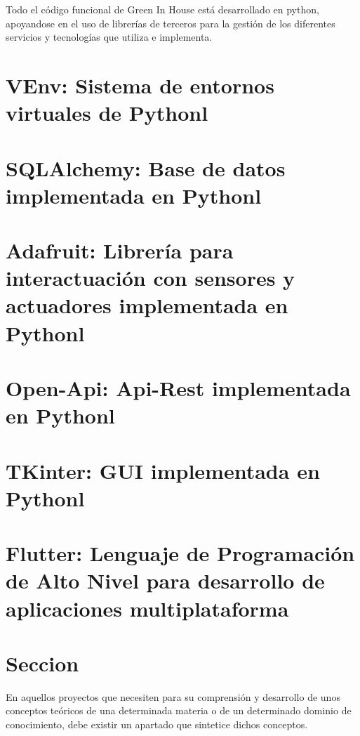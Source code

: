 Todo el código funcional de Green In House está desarrollado en python, apoyandose en el uso de librerías de terceros para la gestión de los diferentes servicios y tecnologías que utiliza e implementa.

\section{VEnv: Sistema de entornos virtuales de Pythonl}



\section{SQLAlchemy: Base de datos implementada en Pythonl}



\section{Adafruit: Librería para interactuación con sensores y actuadores implementada en Pythonl}



\section{Open-Api: Api-Rest implementada en Pythonl}



\section{TKinter: GUI implementada en Pythonl}



\section{Flutter: Lenguaje de Programación de Alto Nivel para desarrollo de aplicaciones multiplataforma}




\section{Seccion}

En aquellos proyectos que necesiten para su comprensión y desarrollo de unos conceptos teóricos de una determinada materia o de un determinado dominio de conocimiento, debe existir un apartado que sintetice dichos conceptos.

